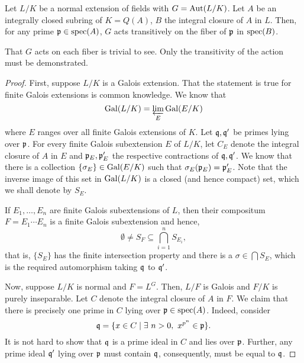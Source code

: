 \begin{lemma}
    Let $L/K$ be a normal extension of fields with $G = \operatorname{Aut}(L/K)$. Let $A$ be an integrally closed subring of $K = Q(A)$, $B$ the integral closure of $A$ in $L$. Then, for any prime $\mathfrak p\in\operatorname{spec}(A)$, $G$ acts transitively on the fiber of $\mathfrak p$ in $\operatorname{spec}(B)$.
\end{lemma}
That $G$ acts on each fiber is trivial to see. Only the transitivity of the action must be demonstrated.
\begin{proof}
    First, suppose $L/K$ is a Galois extension. That the statement is true for finite Galois extensions is common knowledge. We know that 
    \begin{equation*}
        \operatorname{Gal}(L/K) = \varprojlim_{E}\operatorname{Gal}(E/K)
    \end{equation*}
    where $E$ ranges over all finite Galois extensions of $K$. Let $\mathfrak q,\mathfrak q'$ be primes lying over $\mathfrak p$. For every finite Galois subextension $E$ of $L/K$, let $C_E$ denote the integral closure of $A$ in $E$ and $\mathfrak p_E,\mathfrak p_E'$ the respective contractions of $\mathfrak q,\mathfrak q'$. We know that there is a collection $\{\sigma_E\}\in\operatorname{Gal}(E/K)$ such that $\sigma_E(\mathfrak p_E) = \mathfrak p_E'$. Note that the inverse image of this set in $\operatorname{Gal}(L/K)$ is a closed (and hence compact) set, which we shall denote by $S_E$.

    If $E_1,\dots,E_n$ are finite Galois subextensions of $L$, then their compositum $F = E_1\cdots E_n$ is a finite Galois subextension and hence, 
    \begin{equation*}
        \emptyset\ne S_F\subseteq\bigcap_{i = 1}^n S_{E_i},
    \end{equation*}
    that is, $\{S_E\}$ has the finite intersection property and there is a $\sigma\in\bigcap S_E$, which is the required automorphism taking $\mathfrak q$ to $\mathfrak q'$. 

    Now, suppose $L/K$ is normal and $F = L^G$. Then, $L/F$ is Galois and $F/K$ is purely inseparable. Let $C$ denote the integral closure of $A$ in $F$. We claim that there is precisely one prime in $C$ lying over $\mathfrak p\in\operatorname{spec}(A)$. Indeed, consider 
    \begin{equation*}
        \mathfrak q = \{x\in C\mid\exists~n > 0,~x^{p^n}\in\mathfrak p\}.
    \end{equation*}
    It is not hard to show that $\mathfrak q$ is a prime ideal in $C$ and lies over $\mathfrak p$. Further, any prime ideal $\mathfrak q'$ lying over $\mathfrak p$ must contain $\mathfrak q$, consequently, must be equal to $\mathfrak q$.
\end{proof}

